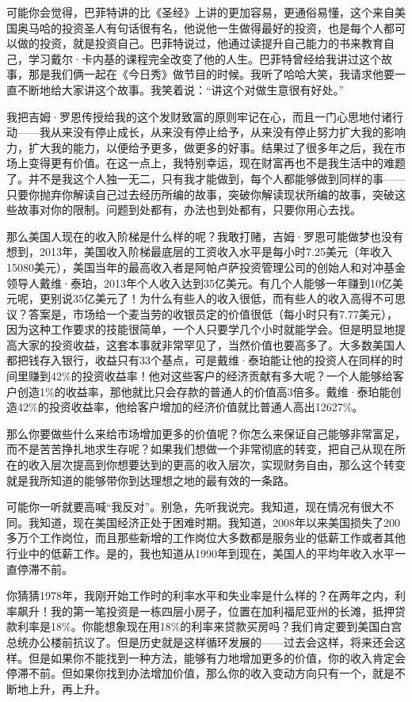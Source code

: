 可能你会觉得，巴菲特讲的比《圣经》上讲的更加容易，更通俗易懂，这个来自美国奥马哈的投资圣人有句话很有名，他说他一生做得最好的投资，也是每个人都可以做的投资，就是投资自己。巴菲特说过，他通过读提升自己能力的书来教育自己，学习戴尔·卡内基的课程完全改变了他的人生。巴菲特曾经给我讲过这个故事，那是我们俩一起在《今日秀》做节目的时候。我听了哈哈大笑，我请求他要一直不断地给大家讲这个故事。我笑着说：“讲这个对做生意很有好处。”

我把吉姆·罗恩传授给我的这个发财致富的原则牢记在心，而且一门心思地付诸行动——我从来没有停止成长，从来没有停止给予，从来没有停止努力扩大我的影响力，扩大我的能力，以便给予更多，做更多的好事。结果过了很多年之后，我在市场上变得更有价值。在这一点上，我特别幸运，现在财富再也不是我生活中的难题了。并不是我这个人独一无二，只有我才能做到，每个人都能够做到同样的事——只要你抛弃你解读自己过去经历所编的故事，突破你解读现状所编的故事，突破这些故事对你的限制。问题到处都有，办法也到处都有，只要你用心去找。

那么美国人现在的收入阶梯是什么样的呢？我敢打赌，吉姆·罗恩可能做梦也没有想到，2013年，美国收入阶梯最底层的工资收入水平是每小时7.25美元（年收入15080美元），美国当年的最高收入者是阿帕卢萨投资管理公司的创始人和对冲基金领导人戴维·泰珀，2013年个人收入达到35亿美元。有几个人能够一年赚到10亿美元呢，更别说35亿美元了！为什么有些人的收入很低，而有些人的收入高得不可思议？答案是，市场给一个麦当劳的收银员定的价值很低（每小时只有7.77美元），因为这种工作要求的技能很简单，一个人只要学几个小时就能学会。但是明显地提高大家的投资收益，这套本事就非常罕见了，当然价值也要高多了。大多数美国人都把钱存入银行，收益只有33个基点，可是戴维·泰珀能让他的投资人在同样的时间里赚到42\%的投资收益率！他对这些客户的经济贡献有多大呢？一个人能够给客户创造1\%的收益率，那他就比只会存款的普通人的价值高3倍多。戴维·泰珀能创造42\%的投资收益率，他给客户增加的经济价值就比普通人高出12627\%。

那么你要做些什么来给市场增加更多的价值呢？你怎么来保证自己能够非常富足，而不是苦苦挣扎地求生存呢？如果我们想做一个非常彻底的转变，把自己从现在所在的收入层次提高到你想要达到的更高的收入层次，实现财务自由，那么这个转变就是我所知道的能够带你到达理想之地的最有效的一条路。

可能你一听就要高喊“我反对”。别急，先听我说完。我知道，现在情况有很大不同。我知道，现在美国经济正处于困难时期。我知道，2008年以来美国损失了200多万个工作岗位，而且那些新增的工作岗位大多数都是服务业的低薪工作或者其他行业中的低薪工作。是的，我也知道从1990年到现在，美国人的平均年收入水平一直停滞不前。

你猜猜1978年，我刚开始工作时的利率水平和失业率是什么样的？在两年之内，利率飙升！我的第一笔投资是一栋四层小房子，位置在加利福尼亚州的长滩，抵押贷款利率是18\%。你能想象现在用18\%的利率来贷款买房吗？我们肯定要到美国白宫总统办公楼前抗议了。但是历史就是这样循环发展的——过去会这样，将来还会这样。但是如果你不能找到一种方法，能够有力地增加更多的价值，你的收入肯定会停滞不前。但如果你找到办法增加价值，那么你的收入变动方向只有一个，就是不断地上升，再上升。

